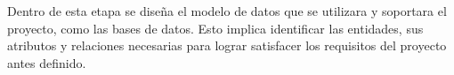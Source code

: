 Dentro de esta etapa se diseña el modelo de datos que se utilizara y soportara el proyecto, como las bases de datos. Esto implica identificar las entidades, sus atributos y relaciones necesarias para lograr satisfacer los requisitos del proyecto antes definido. 

